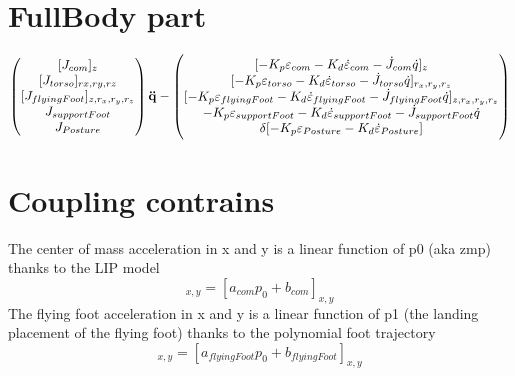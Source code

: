 \documentclass[10pt,a4paper]{article}
\begin{document}
\section*{FullBody part}
\begin{equation}\label{FullBody}
    \begin{pmatrix} 
         [J_{com}]_z\\
         [J_{torso}]_{rx,ry,rz}\\
         [J_{flyingFoot}]_{z,r_x,r_y,r_z}\\
          J_{supportFoot} \\
          J_{Posture} \\
    \end{pmatrix}
    \bold{\ddot{q}}-
        \begin{pmatrix} 
         [-{K_p} \varepsilon_{com}        - {K_d}\dot{\varepsilon}_{com}        - \dot{J}_{com} \dot{q}]_z\\
         [-{K_p} \varepsilon_{torso}      - {K_d}\dot{\varepsilon}_{torso}      - \dot{J}_{torso} \dot{q}]_{r_x,r_y,r_z} \\
         [-{K_p} \varepsilon_{flyingFoot} - {K_d}\dot{\varepsilon}_{flyingFoot}  -\dot{J}_{flyingFoot} \dot{q}]_{z,r_x,r_y,r_z}\\
         -{K_p} \varepsilon_{supportFoot} - {K_d}\dot{\varepsilon}_{supportFoot} -\dot{J}_{supportFoot} \dot{q}\\
         {\delta}[-{K_p} \varepsilon_{Posture} - {K_d}\dot{\varepsilon}_{Posture}] \\
        \end{pmatrix}
\end{equation}

\section*{Coupling contrains}
The center of mass acceleration in x and y is a linear function of p0 (aka zmp) thanks to the LIP model
\begin{equation}
	[{J}_{com} \ddot{q}+\dot{J}_{com} \dot{q}]_{x,y}=[a_{com}p_0+b_{com}]_{x,y}
\end{equation}
The flying foot acceleration in x and y is a linear function of p1 (the landing placement of the flying foot) thanks to the polynomial foot trajectory
\begin{equation}
	[{J}_{flyingFoot} \ddot{q}+\dot{J}_{flyingFoot} \dot{q}]_{x,y}=[a_{flyingFoot}p_0+b_{flyingFoot}]_{x,y}
\end{equation}
\end{document}

